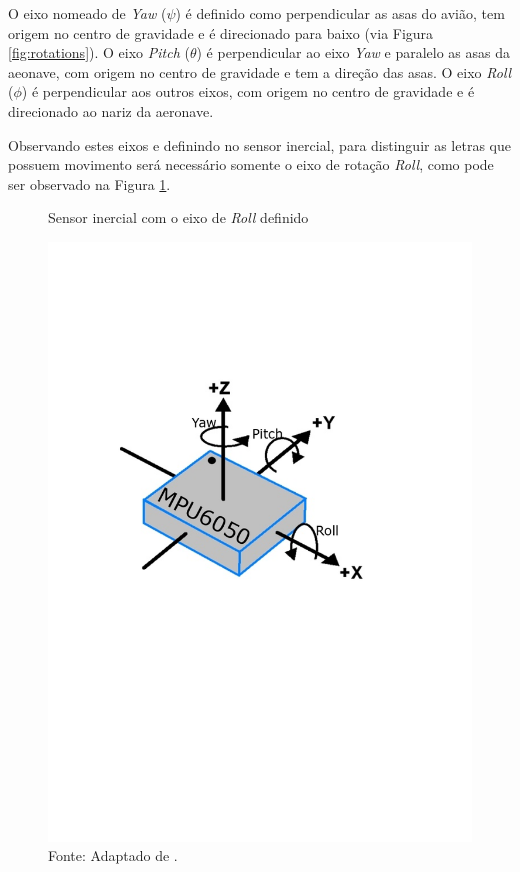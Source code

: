        O eixo nomeado de \textit{Yaw} ($\psi$) é definido como perpendicular as asas do avião, tem origem no centro de gravidade e é direcionado para baixo (via Figura \ref{fig:rotations}). O eixo \textit{Pitch} ($\theta$) é perpendicular ao eixo \textit{Yaw} e paralelo as asas da aeonave, com origem no centro de gravidade e tem a direção das asas.
        O eixo \textit{Roll} ($\phi$) é perpendicular aos outros eixos, com origem no centro de gravidade e é direcionado ao nariz da aeronave.
        
        Observando estes eixos e definindo no sensor inercial, para distinguir as letras que possuem movimento será necessário somente o eixo de rotação \textit{Roll}, como pode ser observado na Figura \ref{fig:mpu_eixos}.
        
        \begin{figure}[H]
        	\vspace{4mm}
            \centering
            \caption{Sensor inercial com o eixo de \textit{Roll} definido}
            \label{fig:mpu_eixos}
            \includegraphics[scale=0.3, trim={4cm 14cm 6cm 7cm}, clip]{imagens/ypr2.png}
            \caption*{Fonte: Adaptado de .}
        \end{figure}
        
